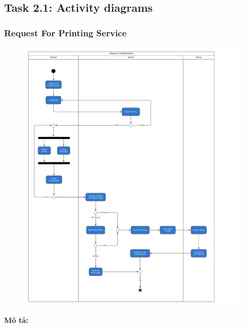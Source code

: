 \subsection{Task 2.1: Activity diagrams}

    \subsubsection{Request For Printing Service}
    \begin{center}
    \begin{figure}[!htp]
    \begin{center}
     \includegraphics[scale=.4]{images/Task2/ActivityDiagrams/RequestForPrintingService.pdf}
    \end{center}
    \label{refhinh1}
    \end{figure}
    \end{center}
    \newpage
    \textbf{Mô tả:}
